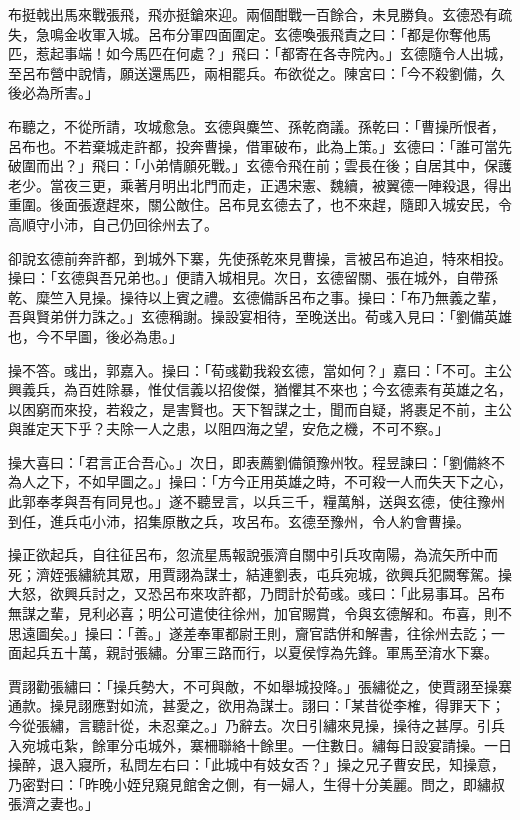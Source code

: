 布挺戟出馬來戰張飛，飛亦挺鎗來迎。兩個酣戰一百餘合，未見勝負。玄德恐有疏失，急鳴金收軍入城。呂布分軍四面圍定。玄德喚張飛責之曰：「都是你奪他馬匹，惹起事端！如今馬匹在何處？」飛曰：「都寄在各寺院內。」玄德隨令人出城，至呂布營中說情，願送還馬匹，兩相罷兵。布欲從之。陳宮曰：「今不殺劉備，久後必為所害。」

布聽之，不從所請，攻城愈急。玄德與麋竺、孫乾商議。孫乾曰：「曹操所恨者，呂布也。不若棄城走許都，投奔曹操，借軍破布，此為上策。」玄德曰：「誰可當先破圍而出？」飛曰：「小弟情願死戰。」玄德令飛在前；雲長在後；自居其中，保護老少。當夜三更，乘著月明出北門而走，正遇宋憲、魏續，被翼德一陣殺退，得出重圍。後面張遼趕來，關公敵住。呂布見玄德去了，也不來趕，隨即入城安民，令高順守小沛，自己仍回徐州去了。

卻說玄德前奔許都，到城外下寨，先使孫乾來見曹操，言被呂布追迫，特來相投。操曰：「玄德與吾兄弟也。」便請入城相見。次日，玄德留關、張在城外，自帶孫乾、糜竺入見操。操待以上賓之禮。玄德備訴呂布之事。操曰：「布乃無義之輩，吾與賢弟併力誅之。」玄德稱謝。操設宴相待，至晚送出。荀彧入見曰：「劉備英雄也，今不早圖，後必為患。」

操不答。彧出，郭嘉入。操曰：「荀彧勸我殺玄德，當如何？」嘉曰：「不可。主公興義兵，為百姓除暴，惟仗信義以招俊傑，猶懼其不來也；今玄德素有英雄之名，以困窮而來投，若殺之，是害賢也。天下智謀之士，聞而自疑，將裹足不前，主公與誰定天下乎？夫除一人之患，以阻四海之望，安危之機，不可不察。」

操大喜曰：「君言正合吾心。」次日，即表薦劉備領豫州牧。程昱諫曰：「劉備終不為人之下，不如早圖之。」操曰：「方今正用英雄之時，不可殺一人而失天下之心，此郭奉孝與吾有同見也。」遂不聽昱言，以兵三千，糧萬斛，送與玄德，使往豫州到任，進兵屯小沛，招集原散之兵，攻呂布。玄德至豫州，令人約會曹操。

操正欲起兵，自往征呂布，忽流星馬報說張濟自關中引兵攻南陽，為流矢所中而死；濟姪張繡統其眾，用賈詡為謀士，結連劉表，屯兵宛城，欲興兵犯闕奪駕。操大怒，欲興兵討之，又恐呂布來攻許都，乃問計於荀彧。彧曰：「此易事耳。呂布無謀之輩，見利必喜；明公可遣使往徐州，加官賜賞，令與玄德解和。布喜，則不思遠圖矣。」操曰：「善。」遂差奉軍都尉王則，齎官誥併和解書，往徐州去訖；一面起兵五十萬，親討張繡。分軍三路而行，以夏侯惇為先鋒。軍馬至淯水下寨。

賈詡勸張繡曰：「操兵勢大，不可與敵，不如舉城投降。」張繡從之，使賈詡至操寨通款。操見詡應對如流，甚愛之，欲用為謀士。詡曰：「某昔從李榷，得罪天下；今從張繡，言聽計從，未忍棄之。」乃辭去。次日引繡來見操，操待之甚厚。引兵入宛城屯紮，餘軍分屯城外，寨柵聯絡十餘里。一住數日。繡每日設宴請操。一日操醉，退入寢所，私問左右曰：「此城中有妓女否？」操之兄子曹安民，知操意，乃密對曰：「昨晚小姪兒窺見館舍之側，有一婦人，生得十分美麗。問之，即繡叔張濟之妻也。」

